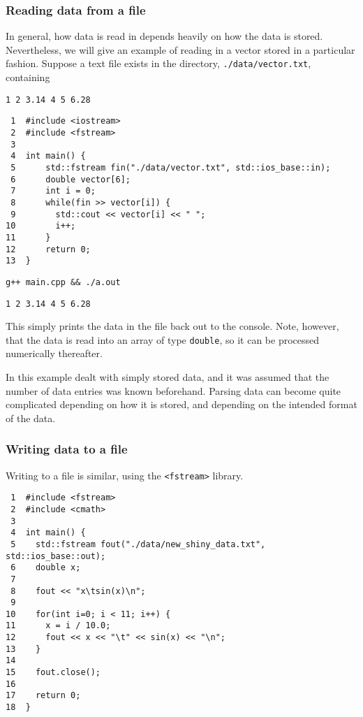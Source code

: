 \documentclass[11pt]{article}
\begin{document}
\subsubsection{Reading data from a file}
\label{sec:orgheadline36}

In general, how data is read in depends heavily on how the data is stored. 
Nevertheless, we will give an example of reading in a vector stored in a 
particular fashion. Suppose a text file exists in the directory, 
\texttt{./data/vector.txt}, containing

\begin{verbatim}
1 2 3.14 4 5 6.28
\end{verbatim}

\begin{verbatim}
 1  #include <iostream>
 2  #include <fstream>
 3  
 4  int main() {
 5      std::fstream fin("./data/vector.txt", std::ios_base::in);
 6      double vector[6];
 7      int i = 0;
 8      while(fin >> vector[i]) {
 9        std::cout << vector[i] << " ";
10        i++;
11      }
12      return 0;
13  }
\end{verbatim}

\begin{verbatim}
g++ main.cpp && ./a.out
\end{verbatim}

\begin{verbatim}
1 2 3.14 4 5 6.28
\end{verbatim}

This simply prints the data in the file back out to the console. Note, however, 
that the data is read into an array of type \texttt{double}, so it can be processed 
numerically thereafter.

In this example dealt with simply stored data, and it was 
assumed that the number of data entries was known beforehand. Parsing 
data can become quite complicated depending on how it is stored, and 
depending on the intended format of the data.

\subsubsection{Writing data to a file}
\label{sec:orgheadline37}

Writing to a file is similar, using the \texttt{<fstream>} library.

\begin{verbatim}
 1  #include <fstream>
 2  #include <cmath>
 3  
 4  int main() {
 5    std::fstream fout("./data/new_shiny_data.txt", std::ios_base::out);
 6    double x;
 7  
 8    fout << "x\tsin(x)\n";
 9  
10    for(int i=0; i < 11; i++) {
11      x = i / 10.0;
12      fout << x << "\t" << sin(x) << "\n";
13    }
14  
15    fout.close();
16  
17    return 0;
18  }
\end{verbatim}
\end{document}
